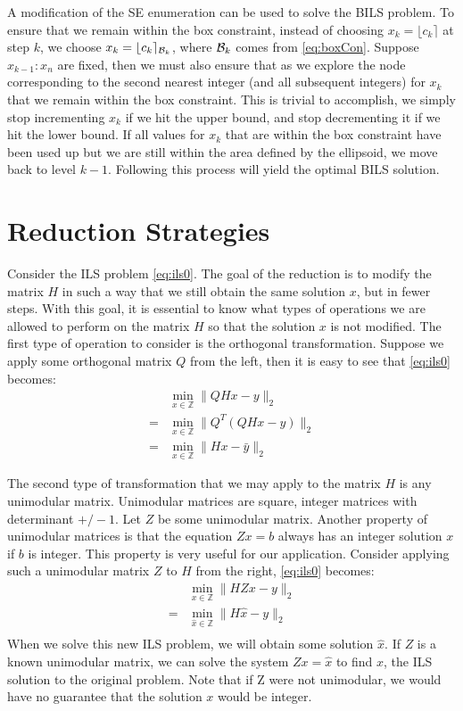 \documentclass[12pt,Bold,letterpaper]{mcgilletdclass}
\begin{document}
A modification of the SE enumeration can be used to solve the BILS problem. To ensure that we remain within the box constraint, instead of choosing $x_k = \lfloor c_k \rceil$ at step $k$, we choose $x_{k} = \lfloor c_{k} \rceil_{{\cal B}_{k}}$, where ${\cal B}_{k}$ comes from \eqref{eq:boxCon}. Suppose $x_{k-1}:x_n$ are fixed, then we must also ensure that as we explore the node corresponding to the second nearest integer (and all subsequent integers) for $x_k$ that we remain within the box constraint. This is trivial to accomplish, we simply stop incrementing $x_k$ if we hit the upper bound, and stop decrementing it if we hit the lower bound. If all values for $x_k$ that are within the box constraint have been used up but we are still within the area defined by the ellipsoid, we move back to level $k-1$. Following this process will yield the optimal BILS solution.

\chapter{Reduction Strategies} \label{chap:Reduction}

Consider the ILS problem \eqref{eq:ils0}. The goal of the reduction is to modify the matrix $H$ in such a way that we still obtain the same solution $x$, but in fewer steps. With this goal, it is essential to know what types of operations we are allowed to perform on the matrix $H$ so that the solution $x$ is not modified. The first type of operation to consider is the orthogonal transformation. Suppose we apply some orthogonal matrix $Q$ from the left, then it is easy to see that \eqref{eq:ils0} becomes: 
\begin{align}
&\min_{x\in {\mathbb{Z} }}  \| QHx - y \|_2\\
=&\min_{x\in {\mathbb{Z} }}  \| Q^T(QHx - y) \|_2\\
=&\min_{x\in {\mathbb{Z} }}  \| Hx - \bar{y} \|_2
\end{align}

The second type of transformation that we may apply to the matrix $H$ is any unimodular matrix. Unimodular matrices are square, integer matrices with determinant $+/-1$. Let $Z$ be some unimodular matrix. Another property of unimodular matrices is that the equation $Zx=b$ always has an integer solution $x$ if $b$ is integer. This property is very useful for our application. Consider applying such a unimodular matrix $Z$ to $H$ from the right, \eqref{eq:ils0} becomes: 
\begin{align}
&\min_{x\in {\mathbb{Z} }}  \| HZx - y \|_2\\
=&\min_{\hat{x}\in {\mathbb{Z} }}  \| H\hat{x} - y \|_2\\
\end{align}
When we solve this new ILS problem, we will obtain some solution $\hat{x}$. If $Z$ is a known unimodular matrix, we can solve the system $Zx = \hat{x}$ to find $x$, the ILS solution to the original problem. Note that if Z were not unimodular, we would have no guarantee that the solution $x$ would be integer.
\end{document}
